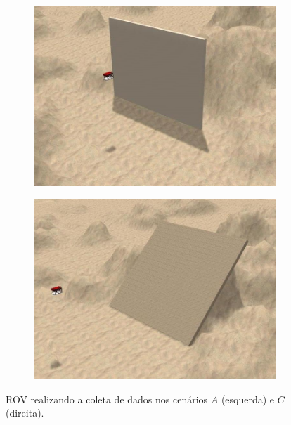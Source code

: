 \begin{figure}[H]
    \centering
    \begin{subfigure}[t]{0.48\textwidth}
        \includegraphics[width=\textwidth]{dados/figuras/projection_wall3.jpg}
        \caption{}
        \label{fig:projection_wall3}
    \end{subfigure}
    \begin{subfigure}[t]{0.48\textwidth}
        \includegraphics[width=\textwidth]{dados/figuras/projection_declined.jpg}
        \caption{}
        \label{fig:projection_declined}
    \end{subfigure}
    \caption{ROV realizando a coleta de dados nos cenários $A$ (esquerda) e $C$ (direita).}
\end{figure}

